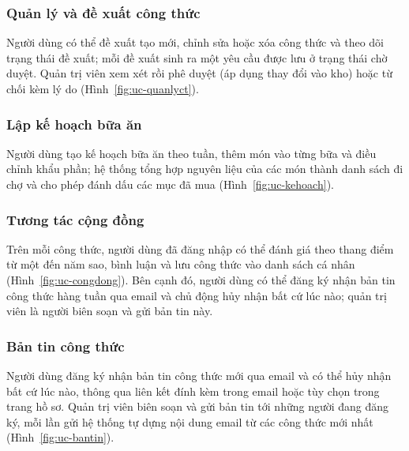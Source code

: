 \documentclass[../DoAn.tex]{subfiles}
\begin{document}

\subsubsection{Quản lý và đề xuất công thức}
Người dùng có thể đề xuất tạo mới, chỉnh sửa hoặc xóa công thức và theo dõi trạng thái đề xuất; mỗi đề xuất sinh ra một yêu cầu được lưu ở trạng thái chờ duyệt. Quản trị viên xem xét rồi phê duyệt (áp dụng thay đổi vào kho) hoặc từ chối kèm lý do (Hình~\ref{fig:uc-quanlyct}).


\subsubsection{Lập kế hoạch bữa ăn}
Người dùng tạo kế hoạch bữa ăn theo tuần, thêm món vào từng bữa và điều chỉnh khẩu phần; hệ thống tổng hợp nguyên liệu của các món thành danh sách đi chợ và cho phép đánh dấu các mục đã mua (Hình~\ref{fig:uc-kehoach}).


\subsubsection{Tương tác cộng đồng}
Trên mỗi công thức, người dùng đã đăng nhập có thể đánh giá theo thang điểm từ một đến năm sao, bình luận và lưu công thức vào danh sách cá nhân (Hình~\ref{fig:uc-congdong}). Bên cạnh đó, người dùng có thể đăng ký nhận bản tin công thức hàng tuần qua email và chủ động hủy nhận bất cứ lúc nào; quản trị viên là người biên soạn và gửi bản tin này.


\subsubsection{Bản tin công thức}
Người dùng đăng ký nhận bản tin công thức mới qua email và có thể hủy nhận bất cứ lúc nào, thông qua liên kết đính kèm trong email hoặc tùy chọn trong trang hồ sơ. Quản trị viên biên soạn và gửi bản tin tới những người đang đăng ký, mỗi lần gửi hệ thống tự dựng nội dung email từ các công thức mới nhất (Hình~\ref{fig:uc-bantin}).
\end{document}
